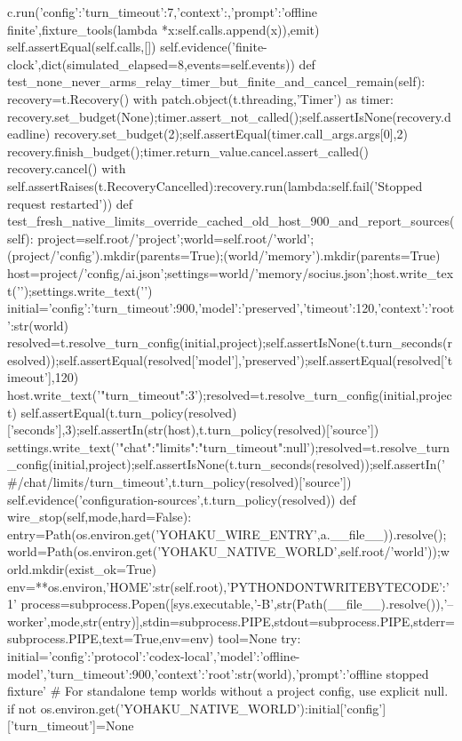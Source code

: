     c.run({'config':{'turn_timeout':7},'context':{},'prompt':'offline finite'},fixture_tools(lambda *x:self.calls.append(x)),emit)
  self.assertEqual(self.calls,[])
  self.evidence('finite-clock',dict(simulated_elapsed=8,events=self.events))
 def test_none_never_arms_relay_timer_but_finite_and_cancel_remain(self):
  recovery=t.Recovery()
  with patch.object(t.threading,'Timer') as timer:
   recovery.set_budget(None);timer.assert_not_called();self.assertIsNone(recovery.deadline)
   recovery.set_budget(2);self.assertEqual(timer.call_args.args[0],2)
   recovery.finish_budget();timer.return_value.cancel.assert_called()
  recovery.cancel()
  with self.assertRaises(t.RecoveryCancelled):recovery.run(lambda:self.fail('Stopped request restarted'))
 def test_fresh_native_limits_override_cached_old_host_900_and_report_sources(self):
  project=self.root/'project';world=self.root/'world';(project/'config').mkdir(parents=True);(world/'memory').mkdir(parents=True)
  host=project/'config/ai.json';settings=world/'memory/socius.json';host.write_text('{}');settings.write_text('{}')
  initial={'config':{'turn_timeout':900,'model':'preserved','timeout':120},'context':{'root':str(world)}}
  resolved=t.resolve_turn_config(initial,project);self.assertIsNone(t.turn_seconds(resolved));self.assertEqual(resolved['model'],'preserved');self.assertEqual(resolved['timeout'],120)
  host.write_text('{"turn_timeout":3}');resolved=t.resolve_turn_config(initial,project)
  self.assertEqual(t.turn_policy(resolved)['seconds'],3);self.assertIn(str(host),t.turn_policy(resolved)['source'])
  settings.write_text('{"chat":{"limits":{"turn_timeout":null}}}');resolved=t.resolve_turn_config(initial,project);self.assertIsNone(t.turn_seconds(resolved));self.assertIn('#/chat/limits/turn_timeout',t.turn_policy(resolved)['source'])
  self.evidence('configuration-sources',t.turn_policy(resolved))
 def wire_stop(self,mode,hard=False):
  entry=Path(os.environ.get('YOHAKU_WIRE_ENTRY',a.__file__)).resolve();world=Path(os.environ.get('YOHAKU_NATIVE_WORLD',self.root/'world'));world.mkdir(exist_ok=True)
  env={**os.environ,'HOME':str(self.root),'PYTHONDONTWRITEBYTECODE':'1'}
  process=subprocess.Popen([sys.executable,'-B',str(Path(__file__).resolve()),'--worker',mode,str(entry)],stdin=subprocess.PIPE,stdout=subprocess.PIPE,stderr=subprocess.PIPE,text=True,env=env)
  tool=None
  try:
   initial={'config':{'protocol':'codex-local','model':'offline-model','turn_timeout':900},'context':{'root':str(world)},'prompt':'offline stopped fixture'}
   # For standalone temp worlds without a project config, use explicit null.
   if not os.environ.get('YOHAKU_NATIVE_WORLD'):initial['config']['turn_timeout']=None

